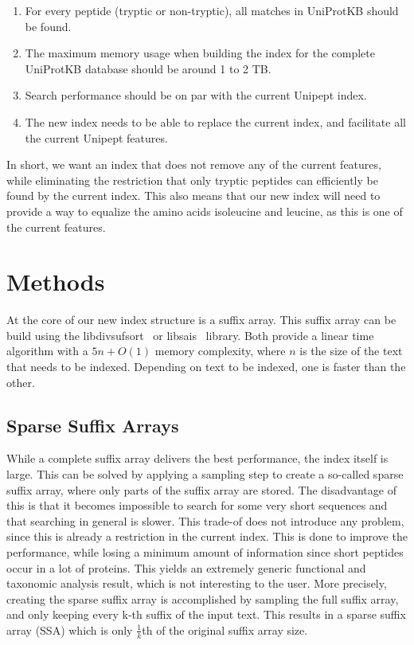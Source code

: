 \documentclass[11pt]{article}
\begin{document}
\begin{multicols}{2}
        \begin{enumerate}
            \item For every peptide (tryptic or non-tryptic), all matches in UniProtKB should be found.
            \item The maximum memory usage when building the index for the complete UniProtKB database should be around 1 to 2 TB\@.
            \item Search performance should be on par with the current Unipept index.
            \item The new index needs to be able to replace the current index, and facilitate all the current Unipept features.
        \end{enumerate}

        In short, we want an index that does not remove any of the current features, while eliminating the restriction that only tryptic peptides can efficiently be found by the current index.
        This also means that our new index will need to provide a way to equalize the amino acids isoleucine and leucine, as this is one of the current features.

        \section{Methods}\label{sec:methods}
        At the core of our new index structure is a suffix array.
        This suffix array can be build using the libdivsufsort~\cite{libdivsufsort} or libsais~\cite{libsais} library.
        Both provide a linear time algorithm with a $5n + O(1)$ memory complexity, where $n$ is the size of the text that needs to be indexed.
        Depending on text to be indexed, one is faster than the other.

        \subsection{Sparse Suffix Arrays}
        While a complete suffix array delivers the best performance, the index itself is large.
        This can be solved by applying a sampling step to create a so-called sparse suffix array, where only parts of the suffix array are stored.
        The disadvantage of this is that it becomes impossible to search for some very short sequences and that searching in general is slower.
        This trade-of does not introduce any problem, since this is already a restriction in the current index.
        This is done to improve the performance, while losing a minimum amount of information since short peptides occur in a lot of proteins.
        This yields an extremely generic functional and taxonomic analysis result, which is not interesting to the user.
        More precisely, creating the sparse suffix array is accomplished by sampling the full suffix array, and only keeping every k-th suffix of the input text.
        This results in a sparse suffix array (SSA) which is only $\frac{1}{k}$th of the original suffix array size.


\end{multicols}
\end{document}
